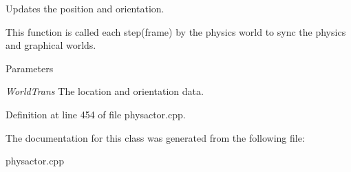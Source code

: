 Updates the position and orientation. 

This function is called each step(frame) by the physics world to sync the physics and graphical worlds. 
\begin{DoxyParams}{Parameters}
\item[{\em WorldTrans}]The location and orientation data. \end{DoxyParams}


Definition at line 454 of file physactor.cpp.



The documentation for this class was generated from the following file:\begin{DoxyCompactItemize}
\item 
physactor.cpp\end{DoxyCompactItemize}
